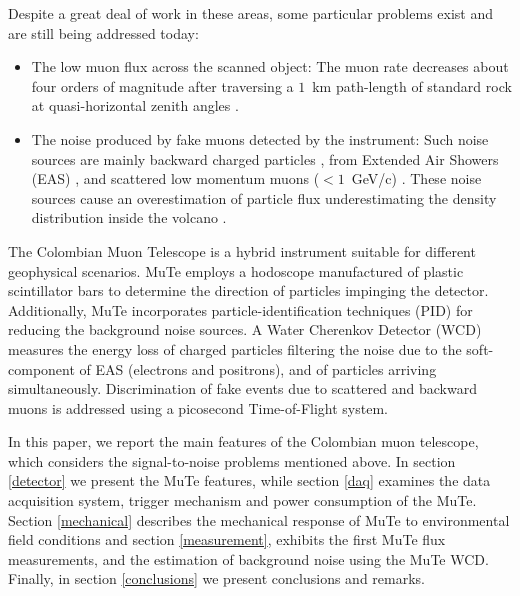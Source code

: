 \documentclass[letterpaper,11pt]{article}
\begin{document}
Despite a great deal of work in these areas, some particular problems exist and are still being addressed today:
\begin{itemize}
\item The low muon flux across the scanned object: The muon rate decreases about four orders of magnitude after traversing a $1$~km path-length of standard rock at quasi-horizontal zenith angles \cite{groom2001muon, groom2000passage}. 

\item The noise produced by fake muons detected by the instrument: Such noise sources are mainly backward charged particles \cite{jourde2013experimental}, from Extended Air Showers (EAS)  \cite{nishiyama2014experimental, Olah2017ICRC, KUSAGAYA2015, Bene2013, Olh2017}, and scattered low momentum muons ($< 1$~GeV/c) \cite{nishiyama2016monte, Gomez2017, Olh2018, Olah2018Invest, ambrosino2015joint}. These noise sources cause an overestimation of particle flux underestimating the density distribution inside the volcano \cite{carbone2013experiment, nishiyama2016monte}.
\end{itemize}

The Colombian Muon Telescope \cite{AsoreyEtal2017B, SierraPortaEtal2018} is a hybrid instrument suitable for different geophysical scenarios. MuTe employs a hodoscope manufactured of plastic scintillator bars to determine the direction of particles impinging the detector. Additionally, MuTe incorporates particle-identification techniques (PID) for reducing the background noise sources\cite{Bonechi2020, pena2019calibration}. A Water Cherenkov Detector (WCD) measures the energy loss of charged particles filtering the noise due to the soft-component of EAS (electrons and positrons), and of particles arriving simultaneously. Discrimination of fake events due to scattered and backward muons is addressed using a picosecond Time-of-Flight system.

In this paper, we report the main features of the Colombian muon telescope, which considers the signal-to-noise problems mentioned above. In section \ref{detector} we present the MuTe features, while section \ref{daq} examines the data acquisition system, trigger mechanism and power consumption of the MuTe. Section \ref{mechanical} describes the mechanical response of MuTe to environmental field conditions and section \ref{measurement}, exhibits the first MuTe flux measurements, and the estimation of background noise using the MuTe WCD. Finally, in section \ref{conclusions} we present conclusions and remarks.
\end{document}
